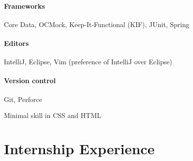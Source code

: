 \documentclass[letterpaper,10pt]{article} %
\begin{document}
\paragraph{Frameworks} Core Data, OCMock, Keep-It-Functional (KIF), JUnit, Spring
\paragraph{Editors} IntelliJ, Eclipse, Vim {\footnotesize (preference of IntelliJ over Eclipse)}
\paragraph{Version control} Git, Perforce

Minimal skill in CSS and HTML

\section{Internship Experience}
\end{document}
